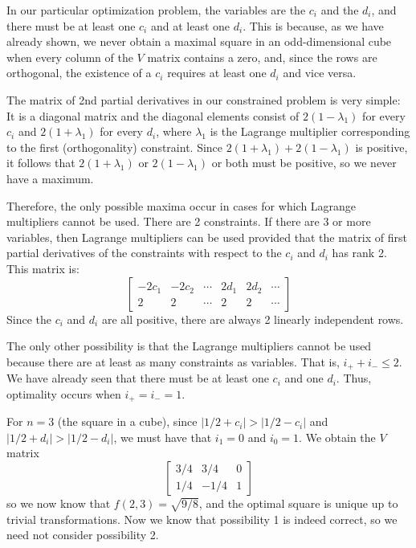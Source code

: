 In our particular optimization problem, the variables are the $c_i$ and the
$d_i$, and there must be at least one $c_i$ and at least one $d_i$. This is
because, as we have already shown, we never obtain a maximal square in an
odd-dimensional cube when every column of the $V$ matrix contains a zero, and,
since the rows are orthogonal, the existence of a $c_i$ requires at least one
$d_i$ and vice versa.

The matrix of 2nd partial derivatives in our constrained problem is very
simple:  It is a diagonal matrix and the diagonal elements consist of
$2(1-\lambda_1)$ for every $c_i$ and $2(1+\lambda_1)$ for every $d_i$, where
$\lambda_1$ is the Lagrange multiplier corresponding to the first
(orthogonality) constraint.  Since $2(1+\lambda_1)+2(1-\lambda_1)$ is
positive, it follows that $2(1+\lambda_1)$ or $2(1-\lambda_1)$ or both must be
positive, so we never have a maximum.

Therefore, the only possible maxima occur in cases for which
Lagrange multipliers cannot be used. There are 2 constraints. If there are
3 or more variables, then Lagrange multipliers can be used provided that
the matrix of first partial derivatives of the constraints with respect to
the $c_i$ and $d_i$ has rank 2. This matrix is:
\begin{equation*}
\left[
\begin{array}{ccc|ccc}
-2 c_1 & -2 c_2 & \cdots & 2 d_1 & 2 d_2 & \cdots \\
 2     &  2     & \cdots & 2     & 2     & \cdots 
\end{array}
\right]
\end{equation*}
Since the $c_i$ and $d_i$ are all positive, there are always 2 linearly
independent rows.

The only other possibility is that the Lagrange multipliers cannot be used
because there are at least as many constraints as variables.  That is, $i_+ +
i_- \leq 2$.  We have already seen that there must be at least one $c_i$ and
one $d_i$.  Thus, optimality occurs when $i_+ = i_- = 1$.

For $n = 3$ (the square in a cube), since $|1/2 + c_i| > |1/2 - c_i|$ and
$|1/2 + d_i| > |1/2 - d_i|$, we must have that $i_1 = 0$ and $i_0 = 1$.  We
obtain the $V$ matrix
\begin{equation*}
\left[
\begin{array}{rrr}
3/4 &  3/4 & 0 \\
1/4 & -1/4 & 1
\end{array}
\right]
\end{equation*}
so we now know that $f(2,3) = \sqrt{9/8}$, and the optimal square is unique up
to trivial transformations.  Now we know that possibility 1 is indeed correct,
so we need not consider possibility 2.

